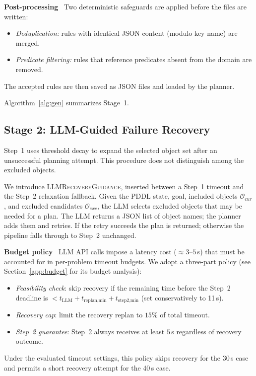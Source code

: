 \documentclass{ieeeaccess}
\newcommand{\sref}[1]{Section~\ref{#1}}
\newcommand{\myparagraph}[1]{\noindent\textbf{#1}~}
\begin{document}
\myparagraph{Post-processing}
Two deterministic safeguards are applied before the files are written:
\begin{itemize}[noitemsep,topsep=2pt]
    \item \emph{Deduplication:} rules with identical JSON content (modulo key name) are merged.
    \item \emph{Predicate filtering:} rules that reference predicates absent from the domain are removed.
\end{itemize}
The accepted rules are then saved as JSON files and loaded by the planner.

Algorithm~\ref{alg:gen} summarizes Stage~1.

\subsection{Stage 2: LLM-Guided Failure Recovery}
\label{sec:stage2}

Step~1 uses threshold decay to expand the selected object set after an unsuccessful planning attempt.
This procedure does not distinguish among the excluded objects.

We introduce \textsc{LLMRecoveryGuidance}, inserted between a Step~1 timeout and the Step~2 relaxation fallback.
Given the PDDL state, goal, included objects $\mathcal{O}_{cur}$, and excluded candidates $\mathcal{O}_{exc}$, the LLM selects excluded objects that may be needed for a plan.
The LLM returns a JSON list of object names; the planner adds them and retries.
If the retry succeeds the plan is returned; otherwise the pipeline falls through to Step~2 unchanged.

\myparagraph{Budget policy}
LLM API calls impose a latency cost (${\approx}3$--$5$\,s) that must be accounted for in per-problem timeout budgets.
We adopt a three-part policy (see \sref{app:budget} for its budget analysis):
\begin{itemize}[noitemsep,topsep=2pt]
  \item \emph{Feasibility check}: skip recovery if the remaining time before the Step~2 deadline is $< t_\text{LLM} + t_\text{replan,min} + t_\text{step2,min}$ (set conservatively to 11\,s).
  \item \emph{Recovery cap}: limit the recovery replan to $15\%$ of total timeout.
  \item \emph{Step~2 guarantee}: Step~2 always receives at least $5$\,s regardless of recovery outcome.
\end{itemize}
Under the evaluated timeout settings, this policy skips recovery for the 30\,s case and permits a short recovery attempt for the 40\,s case.
\end{document}

